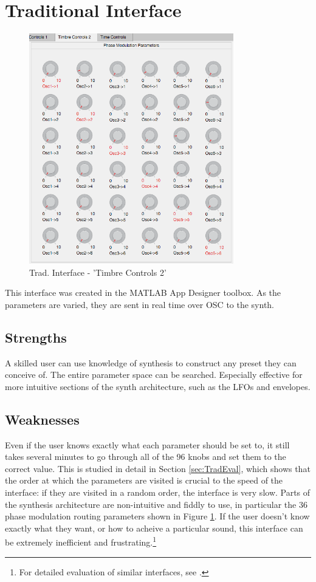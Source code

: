 \documentclass[11pt, oneside]{report}   	%
\begin{document}
\section{Traditional Interface}
\begin{figure}
		\vspace{-30pt}
	\includegraphics[width = 3.5in]{TraditionalUI2.png}
	\caption{Trad. Interface - 'Timbre Controls 2'}
	\label{fig:TraditionalInterface2}
	\vspace{-70pt}
\end{figure}
This interface was created in the MATLAB App Designer toolbox. As the parameters are varied, they are sent in real time over OSC to the synth.
\subsection{Strengths}
A skilled user can use knowledge of synthesis to construct any preset they can conceive of. The entire parameter space can be searched. Especially effective for more intuitive sections of the synth architecture, such as the LFOs and envelopes.
\subsection{Weaknesses}
Even if the user knows exactly what each parameter should be set to, it still takes several minutes to go through all of the 96 knobs and set them to the correct value. This is studied in detail in Section \ref{sec:TradEval}, which shows that the order at which the parameters are visited is crucial to the speed of the interface: if they are visited in a random order, the interface is very slow. Parts of the synthesis architecture are non-intuitive and fiddly to use, in particular the 36 phase modulation routing parameters shown in Figure \ref{fig:TraditionalInterface2}. If the user doesn't know exactly what they want, or how to acheive a particular sound, this interface can be extremely inefficient and frustrating.\footnote{For detailed evaluation of similar interfaces, see \cite{MappingStrategies, TubbThesis, YeeKing}.}
\pagebreak
\end{document}
